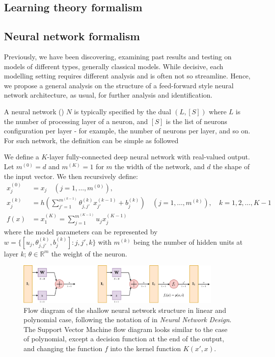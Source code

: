 \documentclass[10pt]{article} %
\begin{document}
\subsection{Learning theory formalism}



\subsection{Neural network formalism}
Previously, we have been discovering, examining past results and testing on models of different types, generally classical models. While decisive, each modelling setting requires different analysis and is often not so streamline. Hence, we propose a general analysis on the structure of a feed-forward style neural network architecture, as usual, for further analysis and identification. 

A neural network (\cite{goodfellow2016deep,zhang2023mathematical}) $N$ is typically specified by the dual $(L,[S])$ where $L$ is the number of processing layer of a neuron, and $[S]$ is the list of neurons configuration per layer - for example, the number of neurons per layer, and so on. For such network, the definition can be simple as followed 

\begin{definition}
    We define a $K$-layer fully-connected deep neural network with real-valued output. Let $m^{(0)}=d$ and $m^{(K)}=1$ for $m$ the width of the network, and $d$ the shape of the input vector. We then recursively define: 
\begin{align}
    x_{j}^{(0)} &= x_{j} \quad (j=1,\dots,m^{(0)}),\\ 
    x_{j}^{(k)} &= h\left(\sum^{m^{(k-1)}}_{j'=1} \theta_{j,j'}^{(k)}x_{j'}^{(k-1)}+ b_{j}^{(k)}\right)\quad (j=1,\dots,m^{(k)}), \quad k = 1,2,\dots,K-1\\
    f(x) & = x_{1}^{(K)} = \sum^{m^{(K-1)}}_{j=1} u_{j}x_{j}^{(K-1)}
\end{align}
where the model parameters can be represented by $w=\{[u_{j}, \theta_{j,j'}^{(k)}, b_{j}^{(k)}]: j,j',k\}$ with $m^{(k)}$ being the number of hidden units at layer $k$; $\theta\in \mathbb{R}^{m}$ the weight of the neuron.
\end{definition}

\begin{figure}[htb]
    \centering
    \includegraphics[width=0.9\textwidth]{structure_network_1.png}
    \caption{Flow diagram of the shallow neural network structure in linear and polynomial case, following the notation of \cite{10.5555/2721661} in \textit{Neural Network Design}. The Support Vector Machine flow diagram looks similar to the case of polynomial, except a decision function at the end of the output, and changing the function $f$ into the kernel function $K(x',x)$.}
\end{figure}
\end{document}
